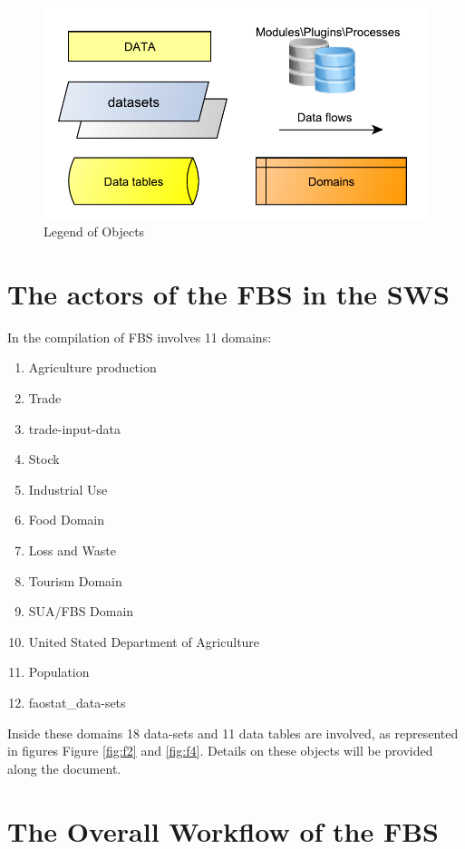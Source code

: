 \documentclass[]{article}
\providecommand{\tightlist}{%
  \setlength{\itemsep}{0pt}\setlength{\parskip}{0pt}}
\begin{document}
\begin{figure}[H]

{\centering \includegraphics[width=0.7\linewidth]{images/SwsFbs/01_actors} 

}

\caption{\label{fig:f1}Legend of Objects}\label{fig:f1}
\end{figure}

\section*{The actors of the FBS in the
SWS}\label{the-actors-of-the-fbs-in-the-sws}

In the compilation of FBS involves 11 domains:

\begin{enumerate}
\def\labelenumi{\arabic{enumi}.}
\tightlist
\item
  Agriculture production
\item
  Trade
\item
  trade-input-data
\item
  Stock
\item
  Industrial Use
\item
  Food Domain
\item
  Loss and Waste
\item
  Tourism Domain
\item
  SUA/FBS Domain
\item
  United Stated Department of Agriculture
\item
  Population
\item
  faostat\_data-sets
\end{enumerate}

Inside these domains 18 data-sets and 11 data tables are involved, as
represented in figures Figure \ref{fig:f2} and \ref{fig:f4}. Details on
these objects will be provided along the document.

\section*{The Overall Workflow of the
FBS}\label{the-overall-workflow-of-the-fbs}
\end{document}
